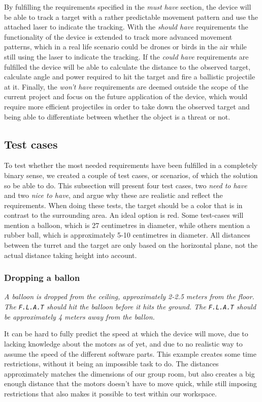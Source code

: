By fulfilling the requirements specified in the \textit{must have} section, the device will be able to track a target with a rather predictable movement pattern and use the attached laser to indicate the tracking. 
With the \textit{should have} requirements the functionality of the device is extended to track more advanced movement patterns, which in a real life scenario could be drones or birds in the air while still using the laser to indicate the tracking.
If the \textit{could have} requirements are fulfilled the device will be able to calculate the distance to the observed target, calculate angle and power required to hit the target and fire a ballistic projectile at it.
Finally, the \textit{won't have} requirements are deemed outside the scope of the current project and focus on the future application of the device, which would require more efficient projectiles in order to take down the observed target and being able to differentiate between whether the object is a threat or not.

\subsection{Test cases}
To test whether the most needed requirements have been fulfilled in a completely binary sense, we created a couple of test cases, or scenarios, of which the solution so be able to do. 
This subsection will present four test cases, two \textit{need to have} and two \textit{nice to have}, and argue why these are realistic and reflect the requirements.
When doing these tests, the target should be a color that is in contrast to the surrounding area.
An ideal option is red.
Some test-cases will mention a balloon, which is 27 centimetres in diameter, while others mention a rubber ball, which is approximately 5-10 centimetres in diameter.
All distances between the turret and the target are only based on the horizontal plane, not the actual distance taking height into account.

\subsubsection{Dropping a ballon}
\textit{A balloon is dropped from the ceiling, approximately 2-2.5 meters from the floor.	
The \texttt{F.L.A.T} should hit the balloon before it hits the ground.
The \texttt{F.L.A.T} should be approximately 4 meters away from the ballon.}

It can be hard to fully predict the speed at which the device will move, due to lacking knowledge about the motors as of yet, and due to no realistic way to assume the speed of the different software parts.
This example creates some time restrictions, without it being an impossible task to do.
The distances approximately matches the dimensions of our group room, but also creates a big enough distance that the motors doesn't have to move quick, while still imposing restrictions that also makes it possible to test within our workspace.

